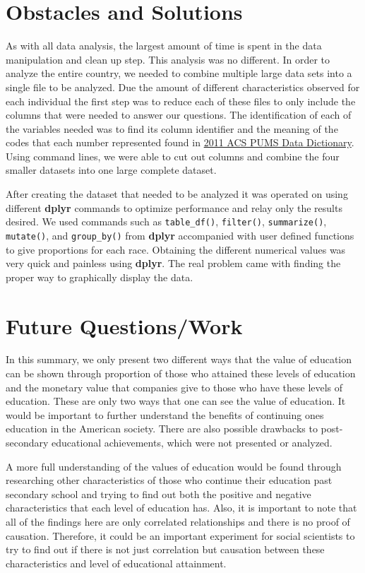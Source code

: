 \documentclass{article}
\begin{document}
\section{Obstacles and Solutions}

As with all data analysis, the largest amount of time is spent in the data manipulation and clean up step. This 
analysis was no different. In order to analyze the entire country, we needed to combine multiple large data sets into a
single file to be analyzed. Due the amount of different characteristics observed for each individual the first step was to 
reduce each of these files to only include the columns that were needed to answer our questions. The identification of 
each of the variables needed was to find its column identifier and the meaning of the codes that each number represented
found in \underline{2011 ACS PUMS Data Dictionary}. Using command lines, we were able to cut out columns and combine 
the four smaller datasets into one large complete dataset. 

After creating the dataset that needed to be analyzed it was operated on using different \textbf{dplyr} commands to 
optimize performance and relay only the results desired. We used commands such as \texttt{table\_df()}, \texttt{filter()},
 \texttt{summarize()}, \texttt{mutate()}, and \texttt{group\_by()} from \textbf{dplyr} accompanied with user defined
  functions to give proportions for each race. Obtaining the different numerical values was very quick and painless using
  \textbf{dplyr}. The real problem came with finding the proper way to graphically display the data.

\section{Future Questions/Work}

In this summary, we only present two different ways that the value of education can be shown through proportion
of those who attained these levels of education and the monetary value that companies give to those who have these
levels of education. These are only two ways that one can see the value of education. It would be important to further
understand the benefits of continuing ones education in the American society. There are also possible drawbacks to 
post-secondary educational achievements, which were not presented or analyzed. 

A more full understanding of the values of education would be found through researching other characteristics of those
who continue their education past secondary school and trying to find out both the positive and negative characteristics
that each level of education has. Also, it is important to note that all of the findings here are only correlated relationships and 
there is no proof of causation. Therefore, it could be an important experiment for social scientists to try to find out if there
is not just correlation but causation between these characteristics and level of educational attainment. 
\end{document}
